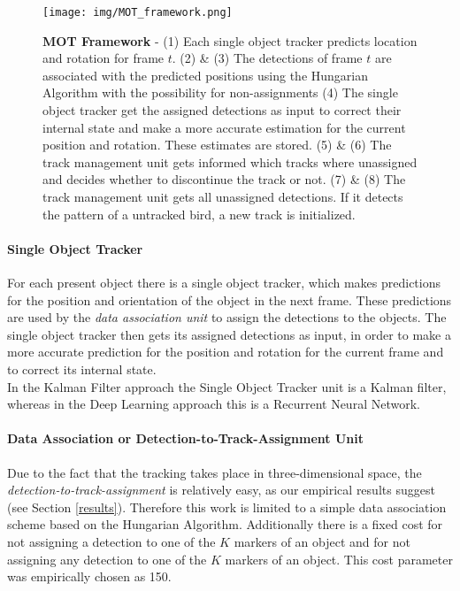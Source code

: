 \documentclass{article}
\begin{document}
\begin{figure}[!htbp]
	\begin{center}
		\texttt{[image: img/MOT\_framework.png]}
		\caption{ \textbf{MOT Framework} - 
			(1) Each single object tracker predicts location and rotation for frame $t$. (2) \& (3) The detections of frame $t$ are associated with the predicted positions using the Hungarian Algorithm with the possibility for non-assignments (4) The single object tracker get the assigned detections as input to correct their internal state and make a more accurate estimation for the current position and rotation. These estimates are stored. (5) \& (6) The track management unit gets informed which tracks where unassigned and decides whether to discontinue the track or not. (7) \& (8) The track management unit gets all unassigned detections. If it detects the pattern of a untracked bird, a new track is initialized. }
		\label{flow_chart}
	\end{center}
\end{figure}

\paragraph{Single Object Tracker} 
For each present object there is a single object tracker, which makes predictions for the position and orientation of the object in the next frame. These predictions are used by the \emph{data association unit} to assign the detections to the objects. The single object tracker then gets its assigned detections as input, in order to make a more accurate prediction for the position and rotation for the current frame and to correct its internal state.\\
In the Kalman Filter approach the Single Object Tracker unit is a Kalman filter, whereas in the Deep Learning approach this is a Recurrent Neural Network. 

\paragraph{Data Association or Detection-to-Track-Assignment Unit} 
Due to the fact that the tracking takes place in three-dimensional space, the \emph{detection-to-track-assignment} is relatively easy, as our empirical results suggest (see Section \ref{results}). Therefore this work is limited to a simple data association scheme based on the Hungarian Algorithm. Additionally there is a fixed cost for not assigning a detection to one of the $K$ markers of an object and for not assigning any detection to one of the $K$ markers of an object. This cost parameter was empirically chosen as 150. %
\end{document}
